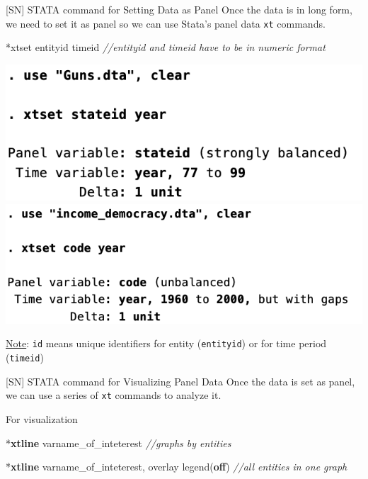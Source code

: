 \documentclass[
  10pt,
  ignorenonframetext,
]{beamer}
\newenvironment{Shaded}{\begin{snugshade}}{\end{snugshade}}
\newcommand{\BaseNTok}[1]{\textcolor[rgb]{0.00,0.00,0.81}{#1}}
\newcommand{\CommentTok}[1]{\textcolor[rgb]{0.56,0.35,0.01}{\textit{#1}}}
\newcommand{\KeywordTok}[1]{\textcolor[rgb]{0.13,0.29,0.53}{\textbf{#1}}}
\newcommand{\NormalTok}[1]{#1}
\begin{document}
\begin{frame}[fragile]{{[}SN{]} STATA command for Setting Data as Panel}
\protect\hypertarget{sn-stata-command-for-setting-data-as-panel}{}
Once the data is in long form, we need to set it as panel so we can use
Stata's panel data \texttt{xt} commands.

\small

\begin{Shaded}
\begin{Highlighting}[]
\NormalTok{*xtset entityid timeid}
\CommentTok{//\textquotesingle{}entityid\textquotesingle{} and \textquotesingle{}timeid\textquotesingle{} have to be in numeric format}
\end{Highlighting}
\end{Shaded}

\begin{center}\includegraphics[width=0.48\linewidth]{pictures/Ex1-xtset} \includegraphics[width=0.48\linewidth]{pictures/Ex2-xtset} \end{center}

\footnotesize

\underline{Note}: \texttt{id} means unique identifiers for entity
(\texttt{entityid}) or for time period (\texttt{timeid})
\end{frame}

\begin{frame}[fragile]{{[}SN{]} STATA command for Visualizing Panel
Data}
\protect\hypertarget{sn-stata-command-for-visualizing-panel-data}{}
Once the data is set as panel, we can use a series of \texttt{xt}
commands to analyze it.

\vspace{3mm}

For visualization \small

\begin{Shaded}
\begin{Highlighting}[]
\NormalTok{*}\KeywordTok{xtline}\NormalTok{ varname\_of\_inteterest}
\CommentTok{//graphs by entities}
\end{Highlighting}
\end{Shaded}

\small

\begin{Shaded}
\begin{Highlighting}[]
\NormalTok{*}\KeywordTok{xtline}\NormalTok{ varname\_of\_inteterest, overlay }\BaseNTok{legend}\NormalTok{(}\KeywordTok{off}\NormalTok{)}
\CommentTok{//all entities in one graph}
\end{Highlighting}
\end{Shaded}
\end{frame}
\end{document}
